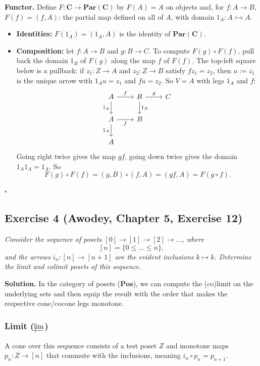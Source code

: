 \textbf{Functor.} Define $F : \mathbf{C} \to \mathbf{Par}(\mathbf{C})$
by $F(A) = A$ on objects and, for $f : A \to B$, $F(f) = (f, A)$: the partial
map defined on all of $A$, with domain $1_A : A \rightarrowtail A$.
\begin{itemize}
  \item \textbf{Identities:} $F(1_A) = (1_A, A)$ is the identity of
    $\mathbf{Par}(\mathbf{C})$.
  \item \textbf{Composition:} let $f : A \to B$ and $g : B \to C$. To compute
    $F(g) \circ F(f)$, pull back the domain $1_B$ of $F(g)$ along the map $f$
    of $F(f)$. The top-left square below is a pullback: if $z_1 : Z \to A$
    and $z_2 : Z \to B$ satisfy $f z_1 = z_2$, then $u := z_1$ is the unique
    arrow with $1_A u = z_1$ and $f u = z_2$. So $V = A$ with legs $1_A$ and
    $f$:
    \[
    \begin{tikzcd}
      A \ar[r, "f"] \ar[d, "1_A"'] & B \ar[r, "g"] \ar[d, "1_B"] & C \\
      A \ar[r, "f"'] \ar[d, "1_A"'] & B & \\
      A & &
    \end{tikzcd}
    \]
    Going right twice gives the map $g f$, going down twice gives the domain
    $1_A 1_A = 1_A$. So
    \[
      F(g) \circ F(f) = (g, B) \circ (f, A) = (g f, A) = F(g \circ f).
    \]
\end{itemize}
\hfill$\square$


\subsection{Exercise 4 (Awodey, Chapter 5, Exercise 12)}
\label{ex:4}

\textit{Consider the sequence of posets $[0] \to [1] \to [2] \to \dots$, where}
\[
  [n] = \{0 \leq \dots \leq n\},
\]
\textit{and the arrows $i_n : [n] \to [n + 1]$ are the evident inclusions
$k \mapsto k$. Determine the limit and colimit posets of this sequence.}

\medskip
\noindent\textbf{Solution.}
In the category of posets ($\mathbf{Pos}$), we can compute the (co)limit on the
underlying sets and then equip the result with the order that makes the
respective cone/cocone legs monotone.

\subsubsection*{Limit ($\varprojlim$)}

A cone over this sequence consists of a test poset $Z$ and monotone maps
$p_n: Z \to [n]$ that commute with the inclusions, meaning
$i_n \circ p_n = p_{n+1}$.

